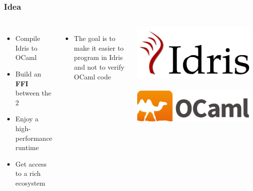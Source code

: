 \documentclass[aspectratio=169]{beamer}
\begin{document}
\begin{frame}[t]
  \frametitle{Idea}
  \begin{columns}[c]
    \begin{itemize}
      \item Compile Idris to OCaml
      \item Build an \textbf{FFI} between the 2
      \item Enjoy a high-performance runtime
      \item Get access to a rich ecosystem
    \end{itemize}
    \begin{itemize}
      \item The goal is to make it easier to program in 
      Idris and not to verify OCaml code
    \end{itemize}
    \includegraphics[width=.5\textwidth]{logo.png}\\~\\
    \includegraphics[width=.5\textwidth]{ocamllogo.png}
  \end{columns}
\end{frame}


\end{document}
